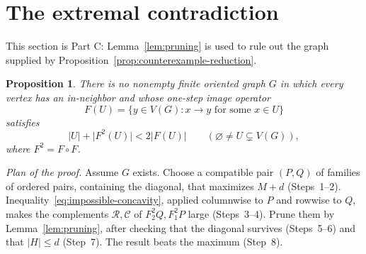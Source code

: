 \documentclass[11pt]{article}
\newtheorem{proposition}[theorem]{Proposition}
\theoremstyle{remark}
\newcommand{\abs}[1]{\lvert #1\rvert}
\begin{document}
\section{The extremal contradiction}\label{sec:incompatibility}

This section is Part C: Lemma~\ref{lem:pruning} is used to rule out the graph
supplied by Proposition~\ref{prop:counterexample-reduction}.

\begin{proposition}\label{prop:no-concavity}
There is no nonempty finite oriented graph $G$ in which every vertex has an
in-neighbor and whose one-step image operator
\[
 F(U)=\{y\in V(G):x\to y\text{ for some }x\in U\}
\]
satisfies
\begin{equation}\label{eq:impossible-concavity}
 \abs{U}+\abs{F^2(U)}<2\abs{F(U)}
 \qquad(\varnothing\ne U\subsetneq V(G)),
\end{equation}
where $F^2=F\circ F$.
\end{proposition}

\emph{Plan of the proof.}  Assume $G$ exists.  Choose a compatible pair
$(P,Q)$ of families of ordered pairs, containing the diagonal, that
maximizes $M+d$ (Steps~1--2).  Inequality~\eqref{eq:impossible-concavity},
applied columnwise to $P$ and rowwise to $Q$, makes the complements
$\mathcal R,\mathcal C$ of $F_2^2Q,F_1^2P$ large (Steps~3--4).  Prune them by
Lemma~\ref{lem:pruning}, after checking that the diagonal survives
(Steps~5--6) and that $\abs H\le d$ (Step~7).  The result beats the maximum
(Step~8).
\end{document}
